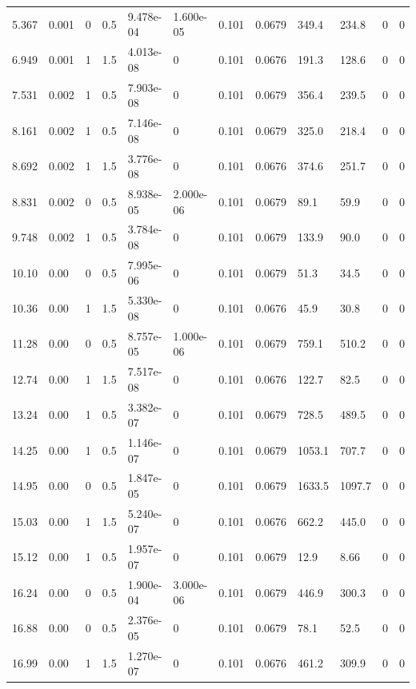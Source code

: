 \documentclass[preview]{standalone}
\begin{document}
{{\begin{tabular}{L{1.2cm}C{1.2cm} C{0.3cm}C{0.5cm} C{1.4cm}C{1.4cm} C{1.4cm}C{1.4cm} C{1.6cm}C{1.6cm} C{1.6cm}C{1.6cm}}
  5.367  &  0.001  & 0     & 0.5 &  9.478e-04  & 1.600e-05  &  0.101&   0.0679& 349.4 & 234.8   &  0 & 0  \\ 
  6.949  &  0.001  & 1     & 1.5 &  4.013e-08  & 0  &  0.101&   0.0676& 191.3 & 128.6   &  0 & 0  \\ 
  7.531  &  0.002  & 1     & 0.5 &  7.903e-08  & 0  &  0.101&   0.0679& 356.4 & 239.5   &  0 & 0  \\ 
  8.161  &  0.002  & 1     & 0.5 &  7.146e-08  & 0  &  0.101&   0.0679& 325.0 & 218.4   &  0 & 0  \\ 
  8.692  &  0.002  & 1     & 1.5 &  3.776e-08  & 0  &  0.101&   0.0676& 374.6 & 251.7   &  0 & 0  \\ 
  8.831  &  0.002  & 0     & 0.5 &  8.938e-05  & 2.000e-06  &  0.101&   0.0679& 89.1 & 59.9   &  0 & 0  \\ 
  9.748  &  0.002  & 1     & 0.5 &  3.784e-08  & 0  &  0.101&   0.0679& 133.9 & 90.0   &  0 & 0  \\ 
  10.10  &  0.00  & 0     & 0.5 &  7.995e-06  & 0  &  0.101&   0.0679& 51.3 & 34.5   &  0 & 0  \\ 
  10.36  &  0.00  & 1     & 1.5 &  5.330e-08  & 0  &  0.101&   0.0676& 45.9 & 30.8   &  0 & 0  \\ 
  11.28  &  0.00  & 0     & 0.5 &  8.757e-05  & 1.000e-06  &  0.101&   0.0679& 759.1 & 510.2   &  0 & 0  \\ 
  12.74  &  0.00  & 1     & 1.5 &  7.517e-08  & 0  &  0.101&   0.0676& 122.7 & 82.5   &  0 & 0  \\ 
  13.24  &  0.00  & 1     & 0.5 &  3.382e-07  & 0  &  0.101&   0.0679& 728.5 & 489.5   &  0 & 0  \\ 
  14.25  &  0.00  & 1     & 0.5 &  1.146e-07  & 0  &  0.101&   0.0679& 1053.1 & 707.7   &  0 & 0  \\ 
  14.95  &  0.00  & 0     & 0.5 &  1.847e-05  & 0  &  0.101&   0.0679& 1633.5 & 1097.7   &  0 & 0  \\ 
  15.03  &  0.00  & 1     & 1.5 &  5.240e-07  & 0  &  0.101&   0.0676& 662.2 & 445.0   &  0 & 0  \\ 
  15.12  &  0.00  & 1     & 0.5 &  1.957e-07  & 0  &  0.101&   0.0679& 12.9 & 8.66   &  0 & 0  \\ 
  16.24  &  0.00  & 0     & 0.5 &  1.900e-04  & 3.000e-06  &  0.101&   0.0679& 446.9 & 300.3   &  0 & 0  \\ 
  16.88  &  0.00  & 0     & 0.5 &  2.376e-05  & 0  &  0.101&   0.0679& 78.1 & 52.5   &  0 & 0  \\ 
  16.99  &  0.00  & 1     & 1.5 &  1.270e-07  & 0  &  0.101&   0.0676& 461.2 & 309.9   &  0 & 0  \\ 

\end{tabular}}}
\end{document}
